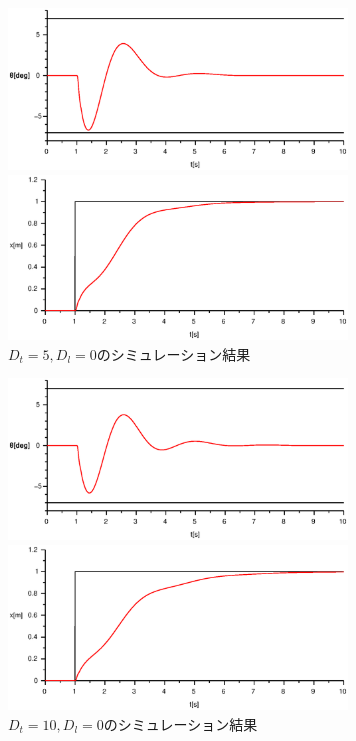 \documentclass[titlepage]{jsarticle}
\begin{document}
            \begin{figure}[h]
                \begin{minipage}{0.5\hsize}
                    \centering
                    \includegraphics[width=9cm]{img/D5-0t.eps}
                \end{minipage}
                \begin{minipage}{0.5\hsize}
                    \centering
                    \includegraphics[width=9cm]{img/D5-0x.eps}
                \end{minipage}
                \caption{$D_t = 5, D_l = 0$のシミュレーション結果}
                \label{fig:d5-0}
            \end{figure}
            \begin{figure}[h]
                \begin{minipage}{0.5\hsize}
                    \centering
                    \includegraphics[width=9cm]{img/D10-0t.eps}
                \end{minipage}
                \begin{minipage}{0.5\hsize}
                    \centering
                    \includegraphics[width=9cm]{img/D10-0x.eps}
                \end{minipage}
                \caption{$D_t = 10, D_l = 0$のシミュレーション結果}
                \label{fig:d10-0}
            \end{figure}
\end{document}

